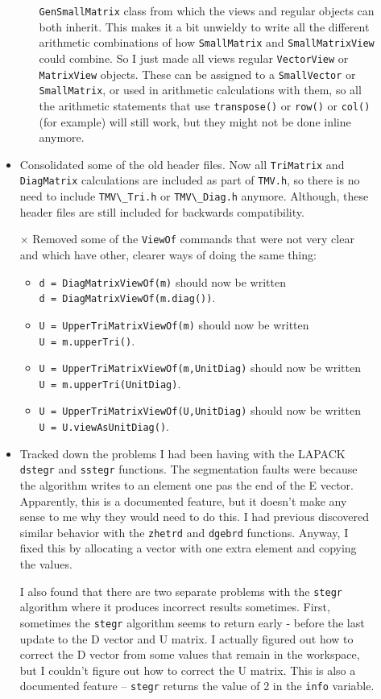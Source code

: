 \documentclass[twoside,letterpaper,11pt]{article}
\renewcommand{\tt}[1]{{\lstinline {#1}}}
\begin{document}
\begin{description}
\begin{itemize}
\begin{itemize}
\tt{GenSmallMatrix} class from which the views and regular objects can both inherit.  This
makes it a bit unwieldy to write all the different arithmetic combinations of how 
\tt{SmallMatrix} and \tt{SmallMatrixView} could combine.  So I just made all views
regular \tt{VectorView} or \tt{MatrixView} objects.  These can be assigned to a \tt{SmallVector}
or \tt{SmallMatrix}, or used in arithmetic calculations with them, so all the arithmetic statements
that use \tt{transpose()} or \tt{row()} or \tt{col()} (for example) will still work, but they might
not be done inline anymore.
\end{itemize}
\item
Consolidated some of the old header files.  Now all \tt{TriMatrix} and \tt{DiagMatrix}
calculations are included as part of \tt{TMV.h}, so there is no need to include \tt{TMV\_Tri.h}
or \tt{TMV\_Diag.h} anymore.  Although, these header files are still included for backwards
compatibility.
\item[$\times$]
Removed some of the \tt{ViewOf} commands that were not very clear and
which have other, clearer ways of doing the same thing:
\begin{itemize}
\item
\tt{d = DiagMatrixViewOf(m)} should now be written\\
\tt{d = DiagMatrixViewOf(m.diag())}.
\item
\tt{U = UpperTriMatrixViewOf(m)} should now be written\\
\tt{U = m.upperTri()}.
\item
\tt{U = UpperTriMatrixViewOf(m,UnitDiag)} should now be written\\
\tt{U = m.upperTri(UnitDiag)}.
\item
\tt{U = UpperTriMatrixViewOf(U,UnitDiag)} should now be written\\
\tt{U = U.viewAsUnitDiag()}.
\end{itemize}
\item
Tracked down the problems I had been having with the LAPACK \tt{dstegr} and \tt{sstegr} 
functions.  The segmentation faults were because the algorithm writes to an element
one pas the end of the E vector.  Apparently, this is a documented feature, but it doesn't
make any sense to me why they would need to do this.  I had previous discovered similar
behavior with the \tt{zhetrd} and \tt{dgebrd} functions.  Anyway, I fixed this by allocating a
vector with one extra element and copying the values.

I also found that there are two separate problems with the \tt{stegr} algorithm where
it produces incorrect results sometimes.
First, sometimes the \tt{stegr} algorithm seems to return early - before the last update
to the D vector and U matrix.  I actually figured out how to correct the D vector from some 
values that remain in the workspace, but I couldn't figure out how to correct the U matrix.
This is also a documented feature -- \tt{stegr} returns the value of 2 in the \tt{info} variable.


\end{itemize}
\end{description}
\end{document}
